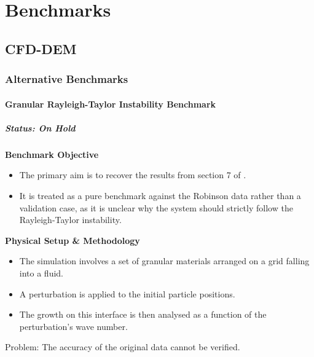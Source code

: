 \chapter{Benchmarks}
\section{CFD-DEM}
\subsection{Alternative Benchmarks}


\begin{frame}
\frametitle{Granular Rayleigh-Taylor Instability Benchmark}
\framesubtitle{Status: On Hold}

    \textbf{Benchmark Objective}
    \begin{itemize}
        \item The primary aim is to recover the results from section 7 of \cite{robinson2014fluid}.
        \item It is treated as a pure benchmark against the Robinson data rather than a validation case, as it is unclear why the system should strictly follow the Rayleigh-Taylor instability.
    \end{itemize}

    \vspace{0.3cm}
    \textbf{Physical Setup \& Methodology}
    \begin{itemize}
        \item The simulation involves a set of granular materials arranged on a grid falling into a fluid.
        \item A perturbation is applied to the initial particle positions.
        \item The growth on this interface is then analysed as a function of the perturbation's wave number.
    \end{itemize}
    
    \vspace{0.3cm}
    \alert{Problem: The accuracy of the original data cannot be verified.} 
\end{frame}
